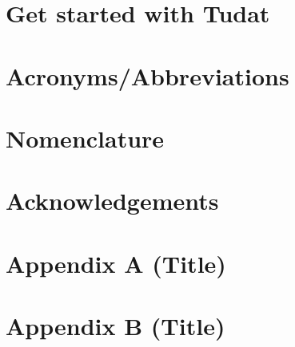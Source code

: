 \documentclass[]{IAC_style_updated}
\begin{document}
\section{Get started with Tudat}
    

\section*{Acronyms/Abbreviations}
    

\section*{Nomenclature}
    

\section*{Acknowledgements}

\section*{Appendix A (Title)}

\section*{Appendix B (Title)}

    \printbibliography
    \label{sec:references}
\end{document}
